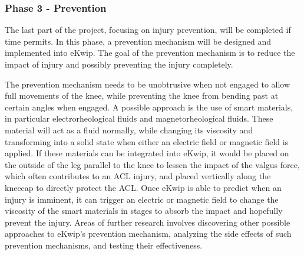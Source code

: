 \subsubsection{Phase 3 - Prevention}
The last part of the project, focusing on injury prevention, will be completed if time permits. In this phase, a prevention mechanism will be designed and implemented into eKwip. The goal of the prevention mechanism is to reduce the impact of injury and possibly preventing the injury completely.

The prevention mechanism needs to be unobtrusive when not engaged to allow full movements of the knee, while preventing the knee from bending past at certain angles when engaged. A possible approach is the use of smart materials, in particular electrorheological fluids and magnetorheological fluids. These material will act as a fluid normally, while changing its viscosity and transforming into a solid state when either an electric field or magnetic field is applied. If these materials can be integrated into eKwip, it would be placed on the outside of the leg parallel to the knee to lessen the impact of the valgus force, which often contributes to an ACL injury, and placed vertically along the kneecap to directly protect the ACL. Once eKwip is able to predict when an injury is imminent, it can trigger an electric or magnetic field to change the viscosity of the smart materials in stages to absorb the impact and hopefully prevent the injury. Areas of further research involves discovering other possible approaches to eKwip’s prevention mechanism, analyzing the side effects of such prevention mechanisms, and testing their effectiveness. 

